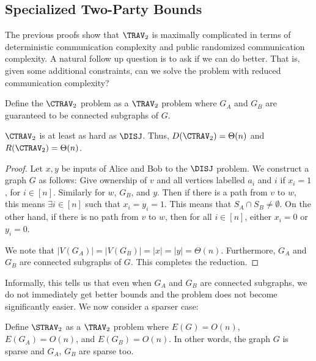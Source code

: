 \subsection{Specialized Two-Party Bounds}

The previous proofs show that $\TRAV_2$ is maximally complicated in terms of deterministic communication complexity and public randomized communication complexity. A natural follow up question is to ask if we can do better. That is, given some additional constraints, can we solve the problem with reduced communication complexity?

\begin{definition}
Define the $\CTRAV_2$ problem as a $\TRAV_2$ problem where $G_A$ and $G_B$ are guaranteed to be connected subgraphs of $G$.
\end{definition}

\begin{claim}
\label{claim:ctrav}
$\CTRAV_2$ is at least as hard as $\DISJ$. Thus, $D(\CTRAV_2) = \Theta(n)$ and $R(\CTRAV_2) = \Theta(n)$.
\end{claim}

\begin{proof} Let $x,y$ be inputs of Alice and Bob to the $\DISJ$ problem. We construct a graph $G$ as follows: Give ownership of $v$ and all vertices labelled $a_i$ and $i$ if $x_i = 1$, for $i \in [n]$. Similarly for $w$, $G_B$, and $y$. Then if there is a path from $v$ to $w$, this means $\exists i \in [n]$ such that $x_i = y_i = 1$. This means that $S_A \cap S_B \neq \emptyset$. On the other hand, if there is no path from $v$ to $w$, then for all $i \in [n]$, either $x_i = 0$ or $y_i = 0$.



We note that $|V(G_A)| = |V(G_B)| = |x| = |y| = \Theta(n)$. Furthermore, $G_A$ and $G_B$ are connected subgraphs of $G$. This completes the reduction.
\end{proof}

% 

Informally, this tells us that even when $G_A$ and $G_B$ are connected subgraphs, we do not immediately get better bounds and the problem does not become significantly easier. We now consider a sparser case:

\begin{definition}
Define $\STRAV_2$ as a $\TRAV_2$ problem where $E(G) = O(n)$, $E(G_A) = O(n)$, and $E(G_B) = O(n)$. In other words, the graph $G$ is sparse and $G_A$, $G_B$ are sparse too.
\end{definition}

